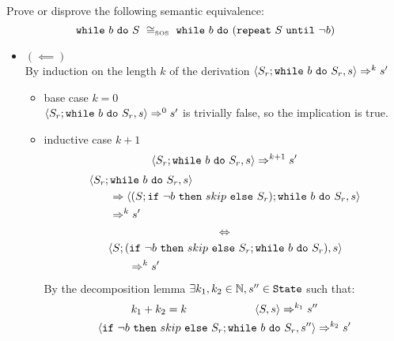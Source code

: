 \begin{exercise}{
    Prove or disprove the following semantic equivalence:
    \[ \wwhile{b}{S}\ \SOScong\ \wwhile{b}{(\wrepeat{S}{\neg b})}  \]
}
\begin{itemize}
\begin{itemize}
\begin{itemize}
\begin{itemize}
\begin{align*}
                                    \end{align*}
                                    Since $\instr{S; \wwhile{b}{S}}{s''} \Rightarrow^{k_2 - 2} s'$ and $k_2 - 2 = k - k_1 - 1 \leq k$ the inductive hypothesis holds and thus $\instr{S_r; \wwhile{b}{S_r}}{s''} \Rightarrow^* s'$
                            \end{itemize}
                    \end{itemize}
                \item $(\impliedby)$ \vspace{0.2cm} \\
                    By induction on the length $k$ of the derivation $\left<S_r; \texttt{while}\ b\ \texttt{do}\ S_r, s\right> \Rightarrow^k s'$
                    \begin{itemize}
                        \item base case $k=0$ \\
                            $\left<S_r; \texttt{while}\ b\ \texttt{do}\ S_r, s\right> \Rightarrow^0 s'$ is trivially false, so the implication is true.
                        \item inductive case $k+1$ \vspace*{-0.3cm}
                        \[ \left<S_r; \texttt{while}\ b\ \texttt{do}\ S_r, s\right> \Rightarrow^{k+1} s' \]
                        \begin{align*}
                            &\left<S_r; \texttt{while}\ b\ \texttt{do}\ S_r, s\right>
                            \\&\qquad\Rightarrow \left<(S; \texttt{if}\ \neg b\ \texttt{then}\ skip\ \texttt{else}\ S_r); \texttt{while}\ b\ \texttt{do}\ S_r, s\right>
                            \\&\qquad\Rightarrow^{k} s'
                        \end{align*}
                        \[ \iff \]
                        \begin{align*}
                            &\left<S; (\texttt{if}\ \neg b\ \texttt{then}\ skip\ \texttt{else}\ S_r; \texttt{while}\ b\ \texttt{do}\ S_r), s\right>
                            \\&\qquad\Rightarrow^{k} s'
                        \end{align*}
                        By the decomposition lemma $\exists k_1, k_2 \in \mathbb{N}, s'' \in \texttt{State}$ such that:
                        \begin{gather*}
                            k_1 + k_2 = k \qquad\qquad\qquad \left<S, s\right> \Rightarrow^{k_1} s'' \\
                            \left<\texttt{if}\ \neg b\ \texttt{then}\ skip\ \texttt{else}\ S_r; \texttt{while}\ b\ \texttt{do}\ S_r, s''\right> \Rightarrow^{k_2} s'
                        \end{gather*}

\end{itemize}
\end{itemize}
\end{itemize}
\end{exercise}

